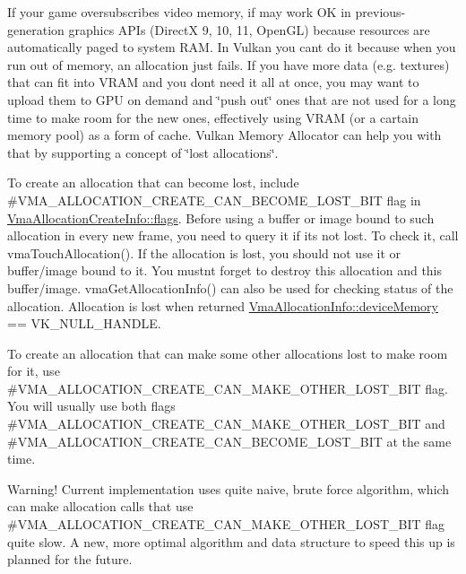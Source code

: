 If your game oversubscribes video memory, if may work OK in previous-\/generation graphics A\+P\+Is (DirectX 9, 10, 11, Open\+GL) because resources are automatically paged to system R\+AM. In Vulkan you can\textquotesingle{}t do it because when you run out of memory, an allocation just fails. If you have more data (e.\+g. textures) that can fit into V\+R\+AM and you don\textquotesingle{}t need it all at once, you may want to upload them to G\+PU on demand and \char`\"{}push out\char`\"{} ones that are not used for a long time to make room for the new ones, effectively using V\+R\+AM (or a cartain memory pool) as a form of cache. Vulkan Memory Allocator can help you with that by supporting a concept of \char`\"{}lost allocations\char`\"{}.

To create an allocation that can become lost, include \#\+V\+M\+A\+\_\+\+A\+L\+L\+O\+C\+A\+T\+I\+O\+N\+\_\+\+C\+R\+E\+A\+T\+E\+\_\+\+C\+A\+N\+\_\+\+B\+E\+C\+O\+M\+E\+\_\+\+L\+O\+S\+T\+\_\+\+B\+IT flag in \hyperlink{structVmaAllocationCreateInfo_add09658ac14fe290ace25470ddd6d41b}{Vma\+Allocation\+Create\+Info\+::flags}. Before using a buffer or image bound to such allocation in every new frame, you need to query it if it\textquotesingle{}s not lost. To check it, call vma\+Touch\+Allocation(). If the allocation is lost, you should not use it or buffer/image bound to it. You mustn\textquotesingle{}t forget to destroy this allocation and this buffer/image. vma\+Get\+Allocation\+Info() can also be used for checking status of the allocation. Allocation is lost when returned \hyperlink{structVmaAllocationInfo_ae0bfb7dfdf79a76ffefc9a94677a2f67}{Vma\+Allocation\+Info\+::device\+Memory} == {\ttfamily V\+K\+\_\+\+N\+U\+L\+L\+\_\+\+H\+A\+N\+D\+LE}.

To create an allocation that can make some other allocations lost to make room for it, use \#\+V\+M\+A\+\_\+\+A\+L\+L\+O\+C\+A\+T\+I\+O\+N\+\_\+\+C\+R\+E\+A\+T\+E\+\_\+\+C\+A\+N\+\_\+\+M\+A\+K\+E\+\_\+\+O\+T\+H\+E\+R\+\_\+\+L\+O\+S\+T\+\_\+\+B\+IT flag. You will usually use both flags \#\+V\+M\+A\+\_\+\+A\+L\+L\+O\+C\+A\+T\+I\+O\+N\+\_\+\+C\+R\+E\+A\+T\+E\+\_\+\+C\+A\+N\+\_\+\+M\+A\+K\+E\+\_\+\+O\+T\+H\+E\+R\+\_\+\+L\+O\+S\+T\+\_\+\+B\+IT and \#\+V\+M\+A\+\_\+\+A\+L\+L\+O\+C\+A\+T\+I\+O\+N\+\_\+\+C\+R\+E\+A\+T\+E\+\_\+\+C\+A\+N\+\_\+\+B\+E\+C\+O\+M\+E\+\_\+\+L\+O\+S\+T\+\_\+\+B\+IT at the same time.

Warning! Current implementation uses quite naive, brute force algorithm, which can make allocation calls that use \#\+V\+M\+A\+\_\+\+A\+L\+L\+O\+C\+A\+T\+I\+O\+N\+\_\+\+C\+R\+E\+A\+T\+E\+\_\+\+C\+A\+N\+\_\+\+M\+A\+K\+E\+\_\+\+O\+T\+H\+E\+R\+\_\+\+L\+O\+S\+T\+\_\+\+B\+IT flag quite slow. A new, more optimal algorithm and data structure to speed this up is planned for the future.

